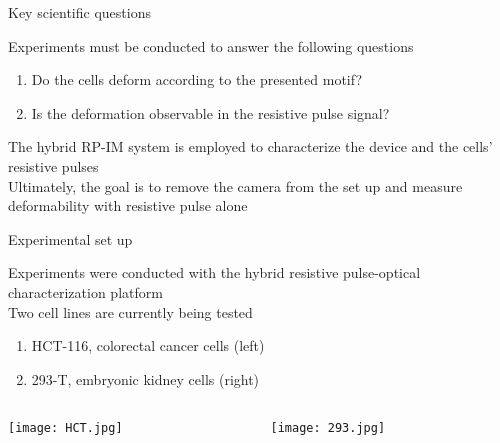 \begin{frame}[c]{Key scientific questions}
	  
	Experiments must be conducted to answer the following questions
	\begin{enumerate}
		\item Do the cells deform according to the presented motif?
		\item Is the deformation observable in the resistive pulse signal?
	\end{enumerate}

	\vspace{.2in}
	
	The hybrid RP-IM system is employed to characterize the device and the cells' resistive pulses \\
	\vspace{0.1in}
	Ultimately, the goal is to remove the camera from the set up and measure deformability with resistive pulse alone \\
	

	
\end{frame}




\begin{frame}[c]{Experimental set up}

	Experiments were conducted with the hybrid resistive pulse-optical characterization platform \\
	Two cell lines are currently being tested \\
	\begin{enumerate}
		\item HCT-116, colorectal cancer cells (left)
		\item 293-T, embryonic kidney cells (right)
	\end{enumerate}
	
	\begin{columns}[t]
		
		\begin{column}[T]{2.25in}
			{\centering
				\texttt{[image: HCT.jpg]} \\
				\par
			}
		\end{column}
		
		\begin{column}[T]{2.25in}
			{\centering
				\texttt{[image: 293.jpg]} \\
				\par
			}
		\end{column}

	\end{columns}

	
	
	

	
\end{frame}

